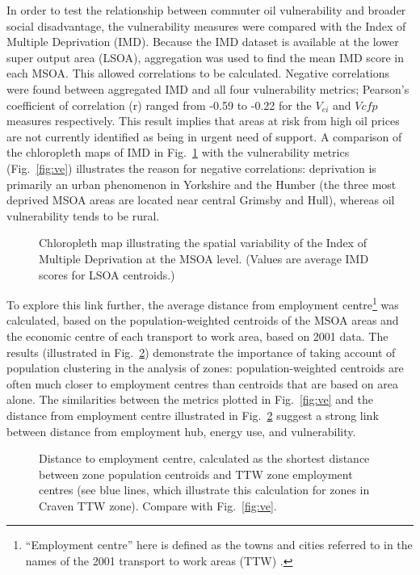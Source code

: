 \documentclass[a4paper, 11pt, twoside]{Thesis}
\begin{document}
In order to test the relationship between commuter oil vulnerability and
broader social disadvantage, the vulnerability measures were compared
with the Index of Multiple Deprivation (IMD). Because the IMD dataset is available
at the lower super output area (LSOA), aggregation was used to find the mean
IMD score in each MSOA. This allowed correlations to be calculated.
Negative correlations were found between aggregated IMD and
all four vulnerability metrics;
Pearson's coefficient of correlation
(r) ranged from -0.59 to -0.22
for the $V_{ei}$ and $V{cfp}$ measures respectively.
This result implies that
areas at risk from high oil prices are not currently identified as
being in urgent need of support. A comparison of the chloropleth maps
of IMD in Fig.~\ref{fig:IMD} with the vulnerability metrics
(Fig.~\ref{fig:ve}) illustrates the reason
for negative correlations: deprivation is primarily an urban phenomenon in
Yorkshire and the Humber (the three most deprived MSOA areas
are located near central Grimsby and Hull),
whereas oil vulnerability tends to be rural.

\begin{figure}[t]
 \centering
 \caption[Chloropleth map of deprivation in Yorkshire and the Humber]
 {Chloropleth map illustrating the spatial variability of
the Index of Multiple Deprivation at the MSOA level. (Values are
average IMD scores for LSOA centroids.)}
 \label{fig:IMD}
\end{figure}

To explore this link further, the average distance from employment
centre\footnote{``Employment centre'' here is defined as the towns and cities
referred to in the names of the 2001 transport to work areas (TTW)
\citep{ONS2011-ttw}.} was calculated, based on the population-weighted centroids
of the MSOA areas and the economic centre of each transport to work area, based
on 2001 data. The results (illustrated in Fig.~\ref{fig:mapttw}) demonstrate
the importance of taking account of population clustering in the analysis of
zones: population-weighted centroids are often much closer to employment
centres than centroids that are based on area alone.
The similarities between
the metrics plotted in Fig.~\ref{fig:ve}
and the distance from employment centre illustrated in Fig.~\ref{fig:mapttw}
suggest a strong link between distance from employment hub, energy use, and
vulnerability.

\begin{figure}[h]
 \centering
 \caption[Distance to employment centre from zone centroids]{Distance to
employment centre, calculated as the shortest distance
between zone population centroids and TTW zone employment centres (see
blue lines, which illustrate this calculation for zones in Craven TTW zone).
 Compare with Fig.~\ref{fig:ve}.}
 \label{fig:mapttw}
\end{figure}
\end{document}
